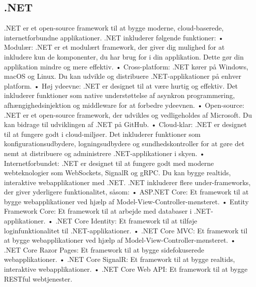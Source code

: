\subsection{.NET}
.NET er et open-source framework til at bygge moderne, cloud-baserede, internetforbundne applikationer. .NET inkluderer følgende funktioner:
•	Modulær: .NET er et modulært framework, der giver dig mulighed for at inkludere kun de komponenter, du har brug for i din applikation. Dette gør din applikation mindre og mere effektiv.
•	Cross-platform: .NET kører på Windows, macOS og Linux. Du kan udvikle og distribuere .NET-applikationer på enhver platform.
•	Høj ydeevne: .NET er designet til at være hurtig og effektiv. Det inkluderer funktioner som native understøttelse af asynkron programmering, afhængighedsinjektion og middleware for at forbedre ydeevnen.
•	Open-source: .NET er et open-source framework, der udvikles og vedligeholdes af Microsoft. Du kan bidrage til udviklingen af .NET på GitHub.
•	Cloud-klar: .NET er designet til at fungere godt i cloud-miljøer. Det inkluderer funktioner som konfigurationsudbydere, logningsudbydere og sundhedskontroller for at gøre det nemt at distribuere og administrere .NET-applikationer i skyen.
•	Internetforbundet: .NET er designet til at fungere godt med moderne webteknologier som WebSockets, SignalR og gRPC. Du kan bygge realtids, interaktive webapplikationer med .NET.
.NET inkluderer flere under-frameworks, der giver yderligere funktionalitet, såsom:
•	ASP.NET Core: Et framework til at bygge webapplikationer ved hjælp af Model-View-Controller-mønsteret.
•	Entity Framework Core: Et framework til at arbejde med databaser i .NET-applikationer.
•	.NET Core Identity: Et framework til at tilføje loginfunktionalitet til .NET-applikationer.
•	.NET Core MVC: Et framework til at bygge webapplikationer ved hjælp af Model-View-Controller-mønsteret.
•	.NET Core Razor Pages: Et framework til at bygge sidefokuserede webapplikationer.
•	.NET Core SignalR: Et framework til at bygge realtids, interaktive webapplikationer.
•	.NET Core Web API: Et framework til at bygge RESTful webtjenester.

